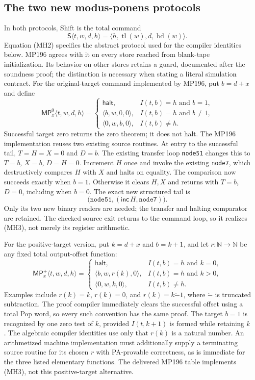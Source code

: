 \subsection{The two new modus-ponens protocols}

In both protocols, Shift is the total command
\[
 \mathsf S\langle t,w,d,h\rangle
   =\langle h,\operatorname{tl}(w),d,\operatorname{hd}(w)\rangle.
 \tag{MH2}
\]
Equation (MH2) specifies the abstract protocol used for the compiler
identities below. MP196 agrees with it on every store reached from
blank-tape initialization. Its behavior on other stores retains a guard,
documented after the soundness proof; the distinction
is necessary when stating a literal simulation contract.
For the original-target command implemented by MP196, put $b=d+x$ and
define
\[
 \mathsf{MP}^{0}_{x}\langle t,w,d,h\rangle=
 \begin{cases}
  \mathsf{halt},&I(t,b)=h\text{ and }b=1,\\
  \langle b,w,0,0\rangle,&I(t,b)=h\text{ and }b\ne1,\\
  \langle0,w,b,0\rangle,&I(t,b)\ne h.
 \end{cases}
 \tag{MH3}
\]
Successful target zero returns the zero theorem; it does not halt.
The MP196 implementation reuses two existing source routines. At entry
to the successful tail, $T=H=X=0$ and $D=b$. The existing transfer loop
\texttt{node51} changes this to $T=b$, $X=b$, $D=H=0$. Increment $H$
once and invoke the existing \texttt{node7}, which destructively compares
$H$ with $X$ and halts on equality. The comparison now succeeds exactly
when $b=1$. Otherwise it clears $H,X$ and returns with $T=b$, $D=0$,
including when $b=0$. The exact new structured tail is
\[
 \bigl(\texttt{node51},
       (\mathsf{inc}\,H,\texttt{node7})\bigr).
\]
Only its two new binary readers are needed; the transfer and halting
comparator are retained. The checked source exit returns to the command
loop, so it realizes (MH3), not merely its register arithmetic.

For the positive-target version, put $k=d+x$ and $b=k+1$, and let
$r\colon\mathbb N\to\mathbb N$ be any fixed total output-offset function:
\[
 \mathsf{MP}^{+}_{x}\langle t,w,d,h\rangle=
 \begin{cases}
  \mathsf{halt},&I(t,b)=h\text{ and }k=0,\\
  \langle b,w,r(k),0\rangle,&I(t,b)=h\text{ and }k>0,\\
  \langle0,w,k,0\rangle,&I(t,b)\ne h.
 \end{cases}
 \tag{MH4}
\]
Examples include $r(k)=k$, $r(k)=0$, and $r(k)=k\mathbin{\dot-}1$,
where $\dot-$ is truncated subtraction. The proof compiler immediately clears the successful
offset using a total Pop word, so every such convention has the same
proof. The target $b=1$ is recognized by one zero test of $k$,
provided $I(t,k+1)$ is formed while retaining $k$. The algebraic compiler
identities use only that $r(k)$ is a natural number. An arithmetized
machine implementation must additionally supply a terminating source
routine for its chosen $r$ with PA-provable correctness, as is immediate
for the three listed elementary functions. The delivered MP196 table
implements (MH3), not this positive-target alternative.

